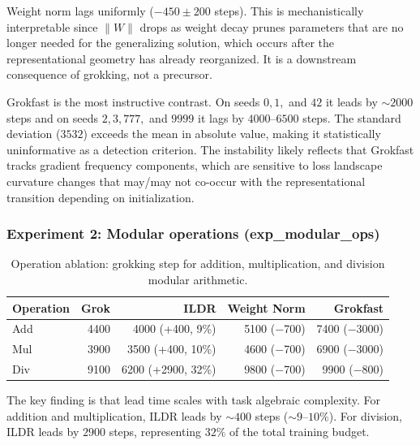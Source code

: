 \documentclass{article}
\begin{document}
\vspace{3pt}

Weight norm lags uniformly ($-450 \pm 200$ steps). This is mechanistically interpretable since $\lVert W \rVert$ drops as weight decay prunes parameters that are no longer needed for the generalizing solution, which occurs after the representational geometry has already reorganized. It is a downstream consequence of grokking, not a precursor.

\vspace{3pt}

Grokfast is the most instructive contrast. On seeds $0, 1,$ and $42$ it leads by $\sim 2000$ steps and on seeds $2, 3, 777,$ and $9999$ it lags by $4000\text{--}6500$ steps. The standard deviation ($3532$) exceeds the mean in absolute value, making it statistically uninformative as a detection criterion. The instability likely reflects that Grokfast tracks gradient frequency components, which are sensitive to loss landscape curvature changes that may/may not co-occur with the representational transition depending on initialization.


\subsubsection{Experiment 2: Modular operations (exp\_modular\_ops)}

\begin{table}[H]
\centering
\begin{tabular}{lrrrr}
\hline
Operation & Grok & ILDR & Weight Norm & Grokfast \\
\hline
Add & 4400 & 4000 (+400, 9\%)   & 5100 ($-$700) & 7400 ($-$3000) \\
Mul & 3900 & 3500 (+400, 10\%)  & 4600 ($-$700) & 6900 ($-$3000) \\
Div & 9100 & 6200 (+2900, 32\%) & 9800 ($-$700) & 9900 ($-$800)  \\
\hline
\end{tabular}
\caption{Operation ablation: grokking step for addition, multiplication, and division modular arithmetic.}
\label{tab:op_ablation}
\end{table}

\vspace{3pt}

The key finding is that lead time scales with task algebraic complexity. For addition and multiplication, ILDR leads by $\sim 400$ steps ($\sim 9\text{--}10\%$). For division, ILDR leads by $2900$ steps, representing $32\%$ of the total training budget. 
\end{document}
